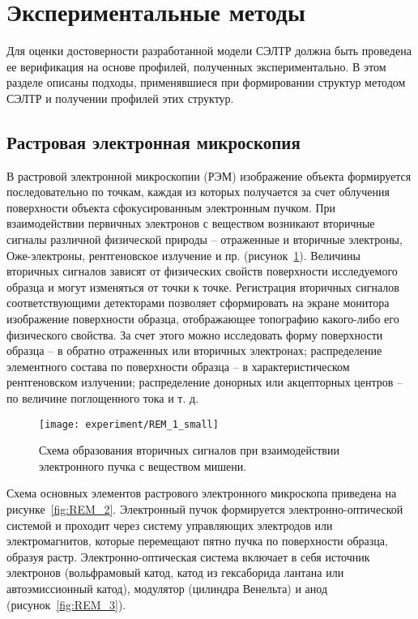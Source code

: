 \section{Экспериментальные методы}

Для оценки достоверности разработанной модели СЭЛТР должна быть проведена ее верификация на основе профилей, полученных экспериментально. В этом разделе описаны подходы, применявшиеся при формировании структур методом СЭЛТР и получении профилей этих структур.

\subsection*{Растровая электронная микроскопия}

В растровой электронной микроскопии (РЭМ) изображение объекта формируется последовательно по точкам, каждая из которых получается за счет облучения поверхности объекта сфокусированным электронным пучком.
При взаимодействии первичных электронов с веществом возникают вторичные сигналы различной физической природы -- отраженные и вторичные электроны, Оже-электроны, рентгеновское излучение и пр. (рисунок~\ref{fig:REM_1}).
Величины вторичных сигналов зависят от физических свойств поверхности исследуемого образца и могут изменяться от точки к точке.
Регистрация вторичных сигналов соответствующими детекторами позволяет сформировать на экране монитора изображение поверхности образца, отображающее топографию какого-либо его физического свойства.
За счет этого можно исследовать форму поверхности образца -- в обратно отраженных или вторичных электронах; распределение элементного состава по поверхности образца -- в характеристическом рентгеновском излучении; распределение донорных или акцепторных центров -- по величине поглощенного тока и т. д.

\begin{figure}
	\centering
	\texttt{[image: experiment/REM\_1\_small]}
	\caption{Схема образования вторичных сигналов при взаимодействии электронного пучка с веществом мишени.}
	\label{fig:REM_1}
\end{figure}

Схема основных элементов растрового электронного микроскопа приведена на рисунке~\ref{fig:REM_2}.
Электронный пучок формируется электронно-оптической системой и проходит через систему управляющих электродов или электромагнитов, которые перемещают пятно пучка по поверхности образца, образуя растр.
Электронно-оптическая система включает в себя источник электронов (вольфрамовый катод, катод из гексаборида лантана или автоэмиссионный катод), модулятор (цилиндра Венельта) и анод (рисунок~\ref{fig:REM_3}).

